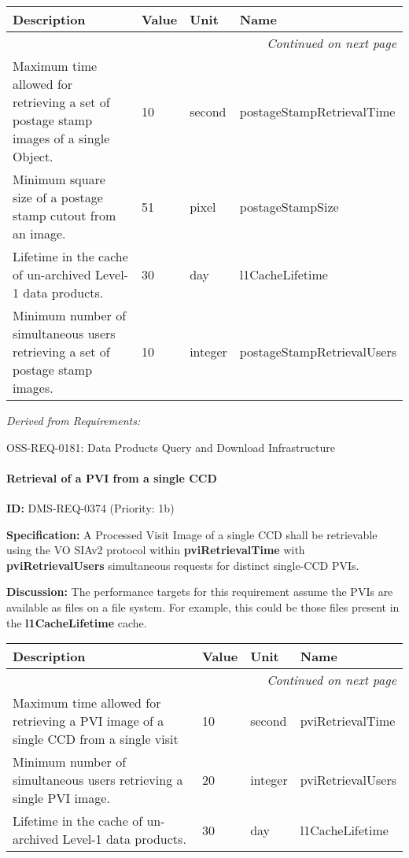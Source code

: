 \documentclass[SE,toc,lsstdraft]{lsstdoc}
\makeatletter
\newcommand{\paramname}[1]{\hspace{0pt}#1}
\newcommand{\unitname}[1]{\hspace{0pt}#1}
\newenvironment{parameters}[0]{%
\setlength\LTleft{0pt}
\setlength\LTright{\fill}
\begin{small}
\begin{longtable}[]{|p{0.49\textwidth}|l|p{0.6in}|p{1.70in}@{}|}

\hline \textbf{Description} & \textbf{Value} & \textbf{Unit} & \textbf{Name} \\ \hline
\endhead

\hline \multicolumn{4}{r}{\emph{Continued on next page}} \\
\endfoot

\hline\hline
\endlastfoot
}{%
\hline
\end{longtable}
\end{small}
}
\makeatother
\begin{document}
\begin{parameters}
Maximum time allowed for retrieving a set of postage stamp images of a single Object.
&
10
&
\unitname{%
second
}
&
\paramname{%
postageStampRetrievalTime
} \\\hline
Minimum square size of a postage stamp cutout from an image.
&
51
&
\unitname{%
pixel
}
&
\paramname{%
postageStampSize
} \\\hline
Lifetime in the cache of un-archived Level-1 data products.
&
30
&
\unitname{%
day
}
&
\paramname{%
l1CacheLifetime
} \\\hline
Minimum number of simultaneous users retrieving a set of postage stamp images.
&
10
&
\unitname{%
integer
}
&
\paramname{%
postageStampRetrievalUsers
} \\\hline
\end{parameters}

\emph{Derived from Requirements:}

OSS-REQ-0181:
Data Products Query and Download Infrastructure \newline

\paragraph{Retrieval of a PVI from a single CCD}\hfill  %

\label{DMS-REQ-0374}
\textbf{ID:} DMS-REQ-0374 (Priority: 1b)

\textbf{Specification:}
A Processed Visit Image of a single CCD shall be retrievable using the VO SIAv2 protocol within \textbf{pviRetrievalTime} with \textbf{pviRetrievalUsers} simultaneous requests for distinct single-CCD PVIs.

\textbf{Discussion:}
The performance targets for this requirement assume the PVIs are available as files on a file system. For example, this could be those files present in the \textbf{l1CacheLifetime} cache.

\begin{parameters}
Maximum time allowed for retrieving a PVI image of a single CCD from a single visit
&
10
&
\unitname{%
second
}
&
\paramname{%
pviRetrievalTime
} \\\hline
Minimum number of simultaneous users retrieving a single PVI image.
&
20
&
\unitname{%
integer
}
&
\paramname{%
pviRetrievalUsers
} \\\hline
Lifetime in the cache of un-archived Level-1 data products.
&
30
&
\unitname{%
day
}
&
\paramname{%
l1CacheLifetime
} \\\hline
\end{parameters}
\end{document}
